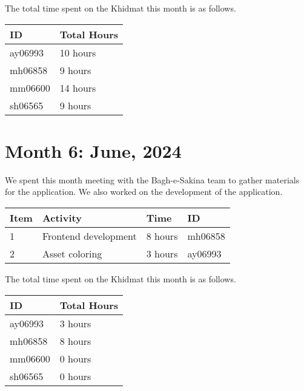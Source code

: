 \documentclass{article}
\begin{document}
\noindent The total time spent on the Khidmat this month is as follows.

\vspace{1em}

\noindent \begin{tabular}{|l|l|}
  \hline
  ID & Total Hours \\\hline
  ay06993 & 10 hours \\ \hline
  mh06858 & 9 hours  \\ \hline
  mm06600 & 14 hours \\ \hline
  sh06565 & 9 hours \\ \hline
\end{tabular}

\newpage %
\section*{Month 6: June, 2024}

We spent this month meeting with the Bagh-e-Sakina team to gather materials for the application. We also worked on the development of the application.

\vspace{1em}

\noindent \begin{tabular}{|l|l|l|l|}
  \hline
  Item & Activity & Time & ID \\ \hline
  1    & Frontend development & 8 hours  & mh06858 \\ \hline
  2 & Asset coloring & 3 hours & ay06993 \\ \hline
\end{tabular}

\vspace{1em}

\noindent The total time spent on the Khidmat this month is as follows.

\vspace{1em}

\noindent \begin{tabular}{|l|l|}
  \hline
  ID      & Total Hours \\\hline
  ay06993 & 3 hours    \\\hline
  mh06858 & 8 hours    \\\hline
  mm06600 & 0 hours    \\\hline
  sh06565 & 0 hours    \\\hline
\end{tabular}
\end{document}
